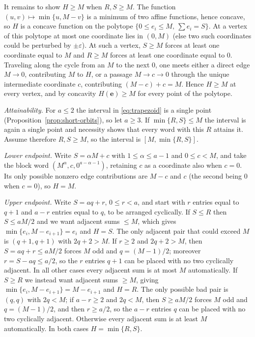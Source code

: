 It remains to show $H\geq M$ when $R,S\geq M$.  The function
$(u,v)\mapsto\min\{u,M-v\}$ is a minimum of two affine functions, hence
concave, so $H$ is a concave function on the polytope
$\{0\leq e_i\leq M,\ \sum e_i=S\}$.  At a vertex of this polytope at most one
coordinate lies in $(0,M)$ (else two such coordinates could be perturbed by
$\pm\varepsilon$).  At such a vertex, $S\geq M$ forces at least one coordinate
equal to $M$ and $R\geq M$ forces at least one coordinate equal to $0$.
Traveling along the cycle from an $M$ to the next $0$, one meets either a
direct edge $M\to0$, contributing $M$ to $H$, or a passage $M\to c\to0$
through the unique intermediate coordinate $c$, contributing
$(M-c)+c=M$.  Hence $H\geq M$ at every vertex, and by concavity
$H(\mathbf{e})\geq M$ for every point of the polytope.

\emph{Attainability.}  For $a\leq2$ the interval in \eqref{eq:trapezoid} is a
single point (Proposition~\ref{prop:short-orbits}), so let $a\geq3$.  If
$\min\{R,S\}\leq M$ the interval is again a single point and necessity shows
that every word with this $R$ attains it.  Assume therefore $R,S\geq M$, so
the interval is $[M,\min\{R,S\}]$.

\emph{Lower endpoint.}  Write $S=\alpha M+c$ with $1\leq\alpha\leq a-1$ and
$0\leq c<M$, and take the block word
$(M^\alpha,c,0^{a-\alpha-1})$, retaining $c$ as a coordinate also when
$c=0$.  Its only possible nonzero edge contributions are $M-c$ and $c$ (the
second being $0$ when $c=0$), so $H=M$.

\emph{Upper endpoint.}  Write $S=aq+r$, $0\leq r<a$, and start with $r$ entries
equal to $q+1$ and $a-r$ entries equal to $q$, to be arranged cyclically.  If
$S\leq R$ then $S\leq aM/2$ and we want adjacent sums $\leq M$, which gives
$\min\{e_i,M-e_{i+1}\}=e_i$ and $H=S$.  The only adjacent pair that could exceed
$M$ is $(q+1,q+1)$ with $2q+2>M$.  If $r\geq2$ and $2q+2>M$, then
$S=aq+r\leq aM/2$ forces $M$ odd and $q=(M-1)/2$; moreover $r=S-aq\leq a/2$,
so the $r$ entries $q+1$ can be placed with no two cyclically adjacent.  In
all other cases every adjacent sum is at most $M$ automatically.  If
$S\geq R$ we instead want adjacent sums $\geq M$, giving
$\min\{e_i,M-e_{i+1}\}=M-e_{i+1}$ and $H=R$.  The only possible bad pair is
$(q,q)$ with $2q<M$; if $a-r\geq2$ and $2q<M$, then $S\geq aM/2$ forces $M$
odd and $q=(M-1)/2$, and then $r\geq a/2$, so the $a-r$ entries $q$ can be
placed with no two cyclically adjacent.  Otherwise every adjacent sum is at
least $M$ automatically.  In both
cases $H=\min\{R,S\}$.

